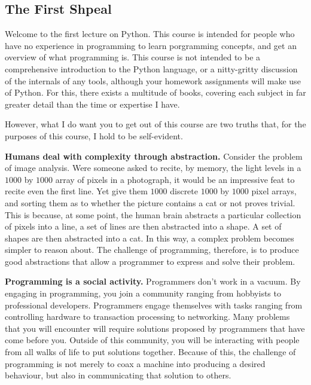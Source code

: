 \subsection{The First Shpeal}

Welcome to the first lecture on Python. This course is intended for people who
have no experience in programming to learn porgramming concepts, and get an
overview of what programming is. This course is not intended to be a 
comprehensive introduction to the Python language, or a nitty-gritty
discussion of the internals of any tools, although your homework assignments
will make use of Python. For this, there exists a multitude of books, covering
each subject in far greater detail than the time or expertise I have.

However, what I do want you to get out of this course are two truths that, for
the purposes of this course, I hold to be self-evident.

\textbf{Humans deal with complexity through abstraction.} Consider the problem
of image analysis. Were someone asked to recite, by memory, the light levels
in a $1000$ by $1000$ array of pixels in a photograph, it would be an
impressive feat to recite even the first line. Yet give them $1000$ discrete
$1000$ by $1000$ pixel arrays, and sorting them as to whether the picture
contains a cat or not proves trivial. This is because, at some point,
the human brain abstracts a particular collection of pixels into a line,
a set of lines are then abstracted into a shape. A set of shapes are then
abstracted into a cat. In this way, a complex problem becomes simpler to
reason about. The challenge of programming, therefore, is to produce good
abstractions that allow a programmer to express and solve their problem.

\textbf{Programming is a social activity.} Programmers don't work in a vacuum.
By engaging in programming, you join a community ranging from hobbyists to
professional developers. Programmers engage themselves with tasks ranging from
controlling hardware to transaction processing to networking. Many problems
that you will encounter will require solutions proposed by programmers that
have come before you. Outside of this community, you will be interacting with
people from all walks of life to put solutions together. Because of this, the
challenge of programming is not merely to coax a machine into producing a 
desired behaviour, but also in communicating that solution to others.

